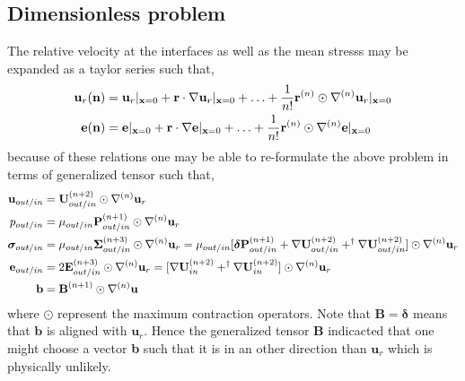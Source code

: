 \subsection*{Dimensionless problem}
The relative velocity at the interfaces as well as the mean stresss may be expanded as a taylor series such that, 
\begin{align*}
    \textbf{u}_r(\textbf{n}) 
    &=  \textbf{u}_r|_{\textbf{x}=0}
    +  \textbf{r} \cdot  \mathbf{\nabla}\textbf{u}_r|_{\textbf{x}=0}
    + \ldots
    +  \frac{1}{n!}\textbf{r}^{(n)} \odot \mathbf{\nabla}^{(n)}\textbf{u}_r|_{\textbf{x}=0}
    \\
     \textbf{e}(\textbf{n}) 
    &=   \textbf{e}|_{\textbf{x}=0}
    + \textbf{r} \cdot  \mathbf{\nabla} \textbf{e}|_{\textbf{x}=0}
    + \ldots
    + \frac{1}{n!}\textbf{r}^{(n)} \odot  \mathbf{\nabla}^{(n)} \textbf{e}|_{\textbf{x}=0}
\end{align*}
because of these relations one may be able to re-formulate the above problem in terms of generalized tensor such that, 
\begin{align}
    \textbf{u}_{out/in} &= \textbf{U}_{out/in}^{(n+2)}\odot \mathbf{\nabla}^{(n)}\textbf{u}_r\\
    p_{out/in} &= \mu_{out/in} \textbf{P}_{out/in}^{(n+1)}\odot \mathbf{\nabla}^{(n)}\textbf{u}_r\\
    \bm\sigma_{out/in}
    &=
    \mu_{out/in} 
    \bm\Sigma^{(n+3)}_{out/in}
    \odot \mathbf{\nabla}^{(n)}\textbf{u}_r
    =
    \mu_{out/in} 
    [
    \bm\delta\textbf{P}_{out/in}^{(n+1)}
    + 
    \mathbf{\nabla} \textbf{U}_{out/in}^{(n+2)}
    + 
    ^\dagger \mathbf{\nabla} \textbf{U}_{out/in}^{(n+2)}]\odot \mathbf{\nabla}^{(n)} \textbf{u}_r\\
    \textbf{e}_{out/in}
    &=
    2\textbf{E}^{(n+3)}_{out/in}
    \odot \mathbf{\nabla}^{(n)}\textbf{u}_r
    =
    [
    \mathbf{\nabla} \textbf{U}_{in}^{(n+2)}
    + 
    ^\dagger \mathbf{\nabla} \textbf{U}_{in}^{(n+2)}]\odot \mathbf{\nabla}^{(n)} \textbf{u}_r\\
    \textbf{b} &=
    \textbf{B}^{(n+1)}\odot \mathbf{\nabla}^{(n)}\textbf{u}
\end{align}
where $\odot$ represent the maximum contraction operators. 
Note that $\textbf{B} = \bm\delta$ means that $\textbf{b}$ is aligned with $\textbf{u}_r$. 
Hence the generalized tensor $\textbf{B}$ indicacted that one might choose a vector \textbf{b} such that it is in an other direction than $\textbf{u}_r$ which is physically unlikely.   
